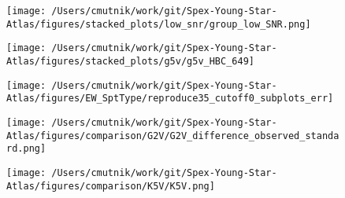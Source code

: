\begin{figure}[h!]
\begin{center}
\texttt{[image: /Users/cmutnik/work/git/Spex-Young-Star-Atlas/figures/stacked\_plots/low\_snr/group\_low\_SNR.png]}
\caption{ \protect}
\end{center}
\end{figure}


\begin{figure}[h!]
\begin{center}
\texttt{[image: /Users/cmutnik/work/git/Spex-Young-Star-Atlas/figures/stacked\_plots/g5v/g5v\_HBC\_649]}
\caption{ \protect}
\end{center}
\end{figure}




\begin{figure}[h!]
\begin{center}
\texttt{[image: /Users/cmutnik/work/git/Spex-Young-Star-Atlas/figures/EW\_SptType/reproduce35\_cutoff0\_subplots\_err]}
\caption{ \protect}
\end{center}
\end{figure}




\begin{figure}[h!]
\begin{center}
\texttt{[image: /Users/cmutnik/work/git/Spex-Young-Star-Atlas/figures/comparison/G2V/G2V\_difference\_observed\_standard.png]}
\caption{ \protect}
\end{center}
\end{figure}


\begin{figure}[h!]
\begin{center}
\texttt{[image: /Users/cmutnik/work/git/Spex-Young-Star-Atlas/figures/comparison/K5V/K5V.png]}
\caption{ \protect}
\end{center}
\end{figure}



{}


